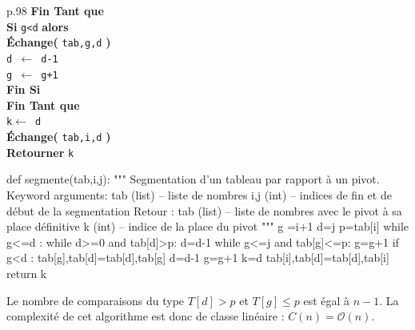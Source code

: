 \documentclass[10pt,fleqn]{article} %
\newcommand{\tsf}[1]{\small{\texttt{#1}}}
\begin{document}
\begin{minipage}[c]{.48\linewidth}
\begin{pseudo}
\begin{tabular}{p{.98\textwidth}}
\hspace{.8cm} \textbf{Fin Tant que}  \\
\hspace{.8cm} \textbf{Si} \tsf{g<d} \textbf{alors} \\
\hspace{1.2cm} \textbf{Échange(} \tsf{tab,g,d} \textbf{)} \\
\hspace{1.2cm} \tsf{d $\leftarrow$ d-1}\\  
\hspace{1.2cm} \tsf{g $\leftarrow$ g+1}\\  
\hspace{.8cm} \textbf{Fin Si} \\
\hspace{.4cm} \textbf{Fin Tant que}  \\
\hspace{.4cm} \tsf{k$\leftarrow$ d}  \\
\hspace{.4cm} \textbf{Échange(} \tsf{tab,i,d} \textbf{)} \\
\hspace{.4cm} \textbf{Retourner} \tsf{k}  \\
\hline
\end{tabular}
\end{pseudo}
\end{minipage}\hfill
\begin{minipage}[c]{.48\linewidth} 
\begin{py}
\begin{python}
def segmente(tab,i,j):
    """
    Segmentation d'un tableau par rapport à
    un pivot.
    Keyword arguments: 
    tab (list) -- liste de nombres
    i,j (int) -- indices de fin et de début de la 
    segmentation
    Retour :    
    tab (list) -- liste de nombres avec le pivot 
    à sa place définitive
    k (int) -- indice de la place du pivot
    """
    g =i+1
    d=j
    p=tab[i]
    while g<=d :
        while d>=0 and tab[d]>p:
            d=d-1
        while g<=j and tab[g]<=p:
            g=g+1
        if g<d :
            tab[g],tab[d]=tab[d],tab[g]
            d=d-1
            g=g+1
    k=d
    tab[i],tab[d]=tab[d],tab[i]
    return k
\end{python}
\end{py}
\end{minipage}

\begin{resultat}
Le nombre de comparaisons du type $T[d]>p$ et $T[g]\leq p$ est égal à $n-1$.
La complexité de cet algorithme est donc de classe linéaire : $C(n)=\mathcal{O}(n)$.
\end{resultat}
\end{document}
